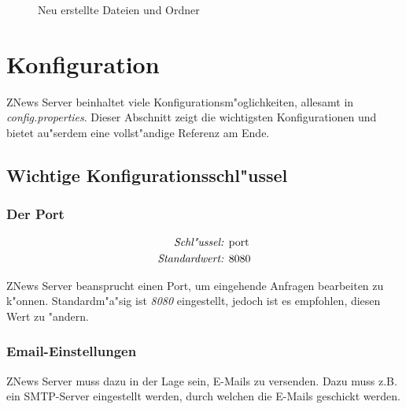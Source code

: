     \begin{figure}[htb]
        \caption{\label{fig:dirtree2}Neu erstellte Dateien und Ordner}
    \end{figure}

    \pagebreak
    \section{Konfiguration}%
    \label{sec:config}

    ZNews Server beinhaltet viele Konfigurationsm"oglichkeiten,
    allesamt in \emph{config.properties}.
    Dieser Abschnitt zeigt die wichtigsten Konfigurationen
    und bietet au"serdem eine vollst"andige Referenz am Ende.

    \subsection{Wichtige Konfigurationsschl"ussel}

    \subsubsection{Der Port}

    \begin{align*}
        \emph{Schl"ussel: } & \lstinline{port}\\
        \emph{Standardwert: } & \lstinline{8080}
    \end{align*}

    ZNews Server beansprucht einen Port, um eingehende
    Anfragen bearbeiten zu k"onnen. Standardm"a"sig ist
    \emph{8080} eingestellt, jedoch ist es empfohlen,
    diesen Wert zu "andern.

    \subsubsection{Email-Einstellungen}

    ZNews Server muss dazu in der Lage sein, E-Mails
    zu versenden. Dazu muss z.B. ein SMTP-Server eingestellt
    werden, durch welchen die E-Mails geschickt werden.

